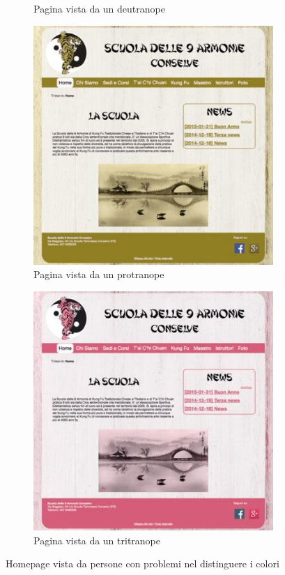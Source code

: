 \begin{figure}
\begin{subfigure}{.5\textwidth}
  \caption{Pagina vista da un deutranope}
  \label{fig:sub2}
\end{subfigure}
\begin{subfigure}{.5\textwidth}
  \centering
  \includegraphics[width=.9\linewidth]{../immagini/protranope.jpg}
  \caption{Pagina vista da un protranope}
  \label{fig:sub3}
\end{subfigure}%
\begin{subfigure}{.5\textwidth}
  \centering
  \includegraphics[width=.9\linewidth]{../immagini/tritranope.jpg}
  \caption{Pagina vista da un tritranope}
  \label{fig:sub4}
\end{subfigure}

\caption{Homepage vista da persone con problemi nel distinguere i colori}
\label{fig:test}
\end{figure}

